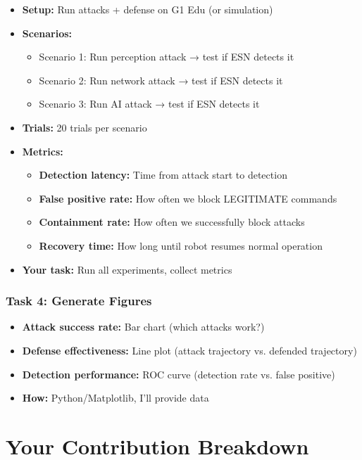 \documentclass[11pt]{article}
\begin{document}
\begin{itemize}
    \item \textbf{Setup:} Run attacks + defense on G1 Edu (or simulation)
    \item \textbf{Scenarios:}
    \begin{itemize}
        \item Scenario 1: Run perception attack → test if ESN detects it
        \item Scenario 2: Run network attack → test if ESN detects it
        \item Scenario 3: Run AI attack → test if ESN detects it
    \end{itemize}
    \item \textbf{Trials:} 20 trials per scenario
    \item \textbf{Metrics:}
    \begin{itemize}
        \item \textbf{Detection latency:} Time from attack start to detection
        \item \textbf{False positive rate:} How often we block LEGITIMATE commands
        \item \textbf{Containment rate:} How often we successfully block attacks
        \item \textbf{Recovery time:} How long until robot resumes normal operation
    \end{itemize}
    \item \textbf{Your task:} Run all experiments, collect metrics
\end{itemize}

\subsubsection{Task 4: Generate Figures}
\begin{itemize}
    \item \textbf{Attack success rate:} Bar chart (which attacks work?)
    \item \textbf{Defense effectiveness:} Line plot (attack trajectory vs. defended trajectory)
    \item \textbf{Detection performance:} ROC curve (detection rate vs. false positive)
    \item \textbf{How:} Python/Matplotlib, I'll provide data
\end{itemize}

\section{Your Contribution Breakdown}
\end{document}

